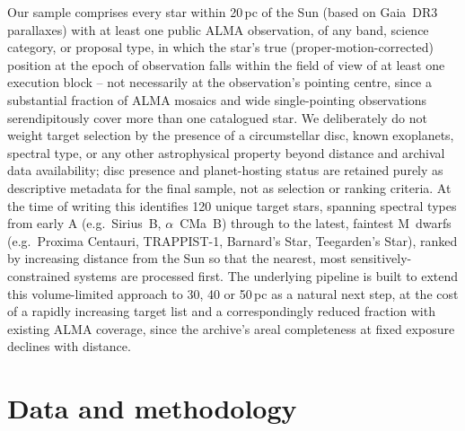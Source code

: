 \documentclass{openjournal}
\begin{document}
Our sample comprises every star within 20\,pc of the Sun (based on Gaia~DR3
parallaxes) with at least one public ALMA observation, of any band, science
category, or proposal type, in which the star's true (proper-motion-corrected)
position at the epoch of observation falls within the field of view of at least
one execution block -- not necessarily at the observation's pointing centre,
since a substantial fraction of ALMA mosaics and wide single-pointing
observations serendipitously cover more than one catalogued star. We deliberately
do not weight target selection by the presence of a circumstellar disc, known
exoplanets, spectral type, or any other astrophysical property beyond distance
and archival data availability; disc presence and planet-hosting status are
retained purely as descriptive metadata for the final sample, not as
selection or ranking criteria. At the time of writing this identifies 120 unique
target stars, spanning spectral types from early A (e.g.\ Sirius~B, $\alpha$~CMa~B)
through to the latest, faintest M~dwarfs (e.g.\ Proxima Centauri, TRAPPIST-1,
Barnard's Star, Teegarden's Star), ranked by increasing distance from the Sun so
that the nearest, most sensitively-constrained systems are processed first. The
underlying pipeline is built to extend this volume-limited approach to 30, 40 or
50\,pc as a natural next step, at the cost of a rapidly increasing target list
and a correspondingly reduced fraction with existing ALMA coverage, since the
archive's areal completeness at fixed exposure declines with distance.

\section{Data and methodology}
\label{sec:method}
\end{document}
